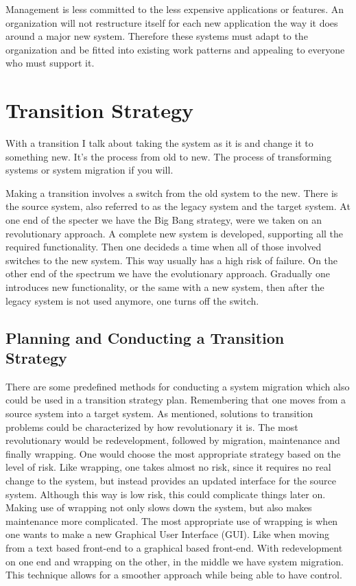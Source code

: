 Management is less committed to the less expensive applications or features.
An organization will not restructure itself for each new application the way it does around a major new system. Therefore these systems must adapt to the organization and be fitted into existing work patterns and appealing to everyone who must support it. 

\section{Transition Strategy}
With a transition I talk about taking the system as it is and change it to something new. 
It's the process from old to new. The process of transforming systems or system migration if you will.

Making a transition involves a switch from the old system to the new. There
is the source system, also referred to as the legacy system and the target
system. At one end of the specter we have the Big Bang strategy, were we
taken on an revolutionary approach. A complete new system is developed,
supporting all the required functionality. Then one decideds a time when all
of those involved switches to the new system. This way usually has a high
risk of failure. On the other end of the spectrum we have the evolutionary
approach. Gradually one introduces new functionality, or the same with a
new system, then after the legacy system is not used anymore, one turns off
the switch.

\subsection{Planning and Conducting a Transition Strategy}
There are some predefined methods for conducting a system migration which
also could be used in a transition strategy plan. Remembering that one
moves from a source system into a target system. As mentioned, solutions to
transition problems could be characterized by how revolutionary it is. The
most revolutionary would be redevelopment, followed by migration, maintenance and finally wrapping. One would choose the most appropriate strategy based on the level of risk. 
Like wrapping, one takes almost no risk, since it requires no real change to the system, but instead provides an updated interface for the source system. Although this way is low risk, this could complicate things later on. Making use of wrapping not only slows down the system,
but also makes maintenance more complicated. The most appropriate use of
wrapping is when one wants to make a new Graphical User Interface (GUI).
Like when moving from a text based front-end to a graphical based front-end.
With redevelopment on one end and wrapping on the other, in the middle we
have system migration. This technique allows for a smoother approach while
being able to have control.

